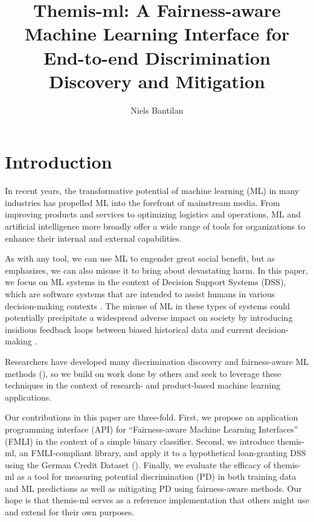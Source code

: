 \documentclass[man,natbib]{apa6}
\title{
  Themis-ml: A Fairness-aware Machine Learning Interface for \\
  End-to-end Discrimination Discovery and Mitigation
}
\author{Niels Bantilan}
\affiliation{Arena.io}
\begin{document}
\maketitle
\section{Introduction} In recent years, the transformative potential of machine
learning (ML) in many industries has propelled ML into the forefront of
mainstream media. From improving products and services to optimizing logistics
and operations, ML and artificial intelligence more broadly offer a wide range
of tools for organizations to enhance their internal and external capabilities.

As with any tool, we can use ML to engender great social benefit, but as
\citet{o2017weapons} emphasizes, we can also misuse it to bring about devastating
harm. In this paper, we focus on ML systems in the context of Decision Support
Systems (DSS), which are software systems that are intended to assist humans in
various decision-making contexts \cite{yoshimura2006decision,
montgomery2000evaluation, barnett1987dxplain, mysiak2005towards}. The misuse of
ML in these types of systems could potentially precipitate a widespread adverse
impact on society by introducing insidious feedback loops between biased
historical data and current decision-making \cite{o2017weapons}.

Researchers have developed many discrimination discovery and fairness-aware ML
methods (\citealp{kusner2017counterfactual, kamiran2012data, kamishima2012fairness,
kamiran2012decision, zemel2013learning, zafar2017fairness, dwork2012fairness,
zliobaite2015survey}), so we build on work done by others and seek to leverage
these techniques in the context of research- and product-based machine learning
applications.

Our contributions in this paper are three-fold. First, we propose an application
programming interface (API) for ``Fairness-aware Machine Learning Interfaces''
(FMLI) in the context of a simple binary classifier. Second, we introduce
themis-ml, an FMLI-compliant library, and apply it to a hypothetical
loan-granting DSS using the German Credit Dataset (\citealp{bache2013uci}). Finally, we
evaluate the efficacy of themis-ml as a tool for measuring potential
discrimination (PD) in both training data and ML predictions as well as
mitigating PD using fairness-aware methods. Our hope is that themis-ml serves as
a reference implementation that others might use and extend for their own
purposes.
\end{document}
